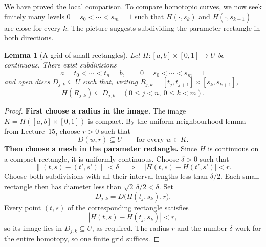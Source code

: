 \documentclass[11pt]{article}
\theoremstyle{plain}
\newtheorem{lemma}[theorem]{Lemma}
\theoremstyle{definition}
\theoremstyle{remark}
\numberwithin{equation}{section}
\begin{document}
We have proved the local comparison. To compare homotopic curves, we
now seek finitely many levels $0=s_0<\cdots<s_m=1$ such that
$H(\cdot,s_k)$ and $H(\cdot,s_{k+1})$ are close for every $k$.
The picture suggests subdividing the parameter rectangle in both directions.

\begin{center}
\end{center}

\begin{lemma}[A grid of small rectangles]\label{lem:grid}
Let $H\colon[a,b]\times[0,1]\to U$ be continuous. There exist subdivisions
\[
 a=t_0<\cdots<t_n=b,\qquad 0=s_0<\cdots<s_m=1
\]
and open discs $D_{j,k}\subseteq U$ such that, writing
$R_{j,k}=[t_j,t_{j+1}]\times[s_k,s_{k+1}]$,
\[
 H(R_{j,k})\subseteq D_{j,k}
 \quad(0\leq j<n,\ 0\leq k<m).
\]
\end{lemma}
\begin{proof}
\textbf{First choose a radius in the image.}
The image $K=H([a,b]\times[0,1])$ is compact. By the
uniform-neighbourhood lemma from Lecture~15, choose $r>0$ such that
\[
 D(w,r)\subseteq U\qquad\text{for every }w\in K.
\]
\textbf{Then choose a mesh in the parameter rectangle.}
Since $H$ is continuous on a compact rectangle, it is uniformly
continuous. Choose $\delta>0$ such that
\[
 \|(t,s)-(t',s')\|<\delta
 \quad\Longrightarrow\quad
 |H(t,s)-H(t',s')|<r.
\]
Choose both subdivisions with all their interval lengths less than
$\delta/2$. Each small rectangle then has diameter less than
$\sqrt{2}\,\delta/2<\delta$. Set
\[
 D_{j,k}=D\bigl(H(t_j,s_k),r\bigr).
\]
Every point $(t,s)$ of the corresponding rectangle satisfies
\[
 |H(t,s)-H(t_j,s_k)|<r,
\]
so its image lies in $D_{j,k}\subseteq U$, as required.
The radius $r$ and the number $\delta$ work for the entire homotopy,
so one finite grid suffices.
\end{proof}
\end{document}
